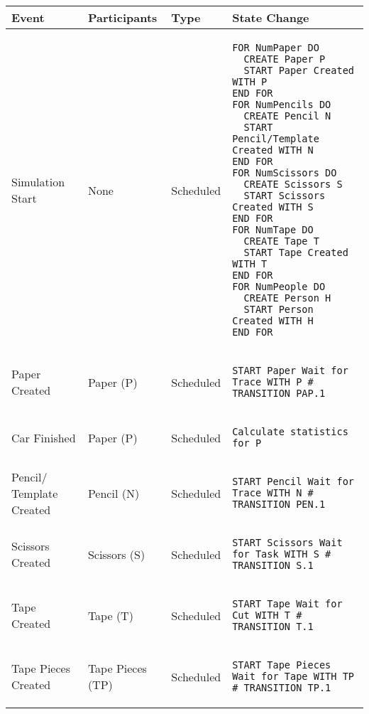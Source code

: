 \begin{longtable}{@{}>{\raggedright\arraybackslash}p{1.5cm}>{\raggedright\arraybackslash}p{2.1cm}>{\raggedright\arraybackslash}p{2.2cm}>{\raggedright\arraybackslash}p{10cm}@{}}
  \toprule
  Event          & Participants & Type       & State Change \\ \midrule
  \endhead
  Simulation Start & None  & Scheduled  & 
  \begin{lstlisting}[language=CMPseudo]
FOR NumPaper DO
  CREATE Paper P
  START Paper Created WITH P
END FOR
FOR NumPencils DO
  CREATE Pencil N
  START Pencil/Template Created WITH N
END FOR
FOR NumScissors DO
  CREATE Scissors S
  START Scissors Created WITH S
END FOR
FOR NumTape DO
  CREATE Tape T
  START Tape Created WITH T
END FOR
FOR NumPeople DO
  CREATE Person H
  START Person Created WITH H
END FOR
  \end{lstlisting}
  \\ \midrule
  Paper Created & Paper (P)  & Scheduled  & 
  \begin{lstlisting}[language=CMPseudo]
START Paper Wait for Trace WITH P # TRANSITION PAP.1
  \end{lstlisting}
  \\ \midrule
  Car Finished & Paper (P)  & Scheduled  & 
  \begin{lstlisting}[language=CMPseudo]
Calculate statistics for P
  \end{lstlisting}
  \\ \midrule
  Pencil/ Template Created & Pencil (N)  & Scheduled  & 
  \begin{lstlisting}[language=CMPseudo]
START Pencil Wait for Trace WITH N # TRANSITION PEN.1
  \end{lstlisting}
  \\ \midrule
  Scissors Created & Scissors (S)  & Scheduled  & 
  \begin{lstlisting}[language=CMPseudo]
START Scissors Wait for Task WITH S # TRANSITION S.1
  \end{lstlisting}
  \\ \midrule
  Tape Created & Tape (T)  & Scheduled  & 
  \begin{lstlisting}[language=CMPseudo]
START Tape Wait for Cut WITH T # TRANSITION T.1
  \end{lstlisting}
  \\ \midrule
  Tape Pieces Created & Tape Pieces (TP)  & Scheduled  & 
  \begin{lstlisting}[language=CMPseudo]
START Tape Pieces Wait for Tape WITH TP # TRANSITION TP.1
  \end{lstlisting}

\end{longtable}
